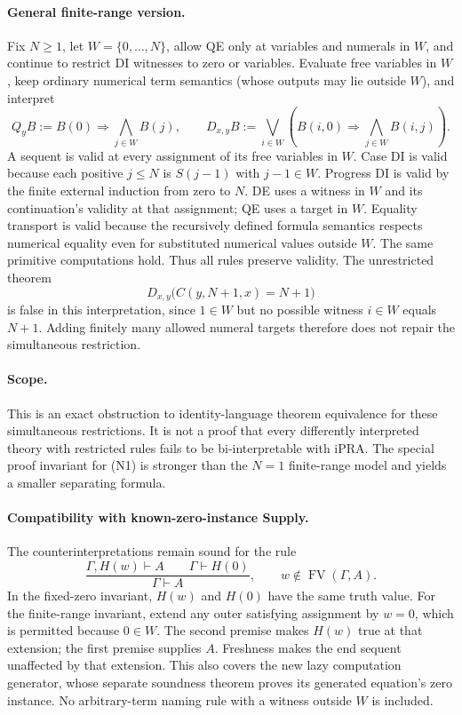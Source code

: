\paragraph{General finite-range version.}
Fix $N\geq1$, let $W=\{0,\ldots,N\}$, allow QE only at variables and
numerals in $W$, and continue to restrict DI witnesses to zero or
variables. Evaluate free variables in $W$, keep ordinary numerical term
semantics (whose outputs may lie outside $W$), and interpret
\[
Q_yB := B(0)\Rightarrow\bigwedge_{j\in W} B(j),\qquad
D_{x,y}B := \bigvee_{i\in W}\left(B(i,0)\Rightarrow
                              \bigwedge_{j\in W}B(i,j)\right).
\]
A sequent is valid at every assignment of its free variables in $W$.
Case DI is valid because each positive $j\leq N$ is $S(j-1)$ with
$j-1\in W$. Progress DI is valid by the finite external induction from
zero to $N$. DE uses a witness in $W$ and its continuation's validity at
that assignment; QE uses a target in $W$. Equality transport is valid
because the recursively defined formula semantics respects numerical
equality even for substituted numerical values outside $W$.
The same primitive computations hold. Thus all rules preserve validity.
The unrestricted theorem
\[
D_{x,y}\bigl(C(y,N+1,x)=N+1\bigr)
\]
is false in this interpretation, since $1\in W$ but no possible witness
$i\in W$ equals $N+1$. Adding finitely many allowed numeral targets
therefore does not repair the simultaneous restriction.

\paragraph{Scope.}
This is an exact obstruction to identity-language theorem equivalence for
these simultaneous restrictions. It is not a proof that every differently
interpreted theory with restricted rules fails to be bi-interpretable with
iPRA. The special proof invariant for (N1) is stronger than the $N=1$
finite-range model and yields a smaller separating formula.

\paragraph{Compatibility with known-zero-instance Supply.}
The counterinterpretations remain sound for the rule
\[
\frac{\Gamma,H(w)\vdash A\qquad\Gamma\vdash H(0)}
     {\Gamma\vdash A},\qquad w\notin\operatorname{FV}(\Gamma,A).
\]
In the fixed-zero invariant, $H(w)$ and $H(0)$ have the same truth value.
For the finite-range invariant, extend any outer satisfying assignment
by $w=0$, which is permitted because $0\in W$. The second premise makes
$H(w)$ true at that extension; the first premise supplies $A$. Freshness
makes the end sequent unaffected by that extension. This also covers the
new lazy computation generator, whose separate soundness theorem proves
its generated equation's zero instance. No arbitrary-term naming rule
with a witness outside $W$ is included.
